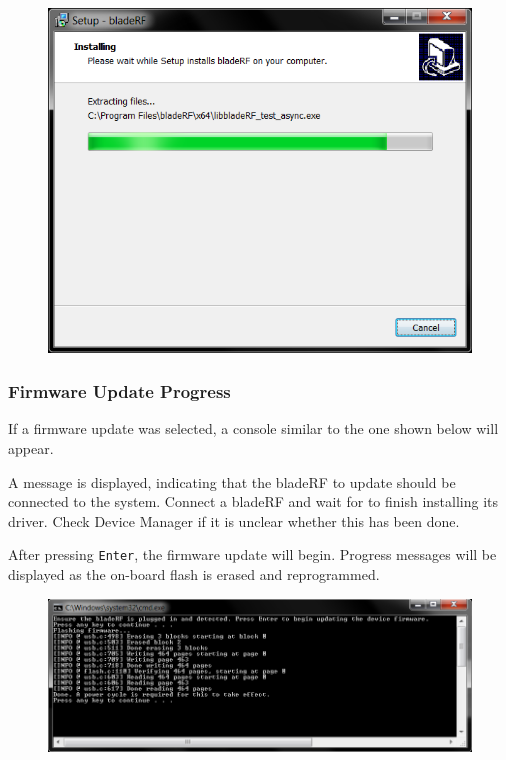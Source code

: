 {\begin{figure}[h]
  \centering
  \includegraphics{images/windows/installer/08-installing.png}
\end{figure}

\newpage
\subsubsection{Firmware Update Progress}

If a firmware update was selected, a console similar to the one
shown below will appear.

A message is displayed, indicating that the bladeRF to update should
be connected to the system. Connect a bladeRF and wait for \windows
to finish installing its driver. Check Device Manager if it is unclear
whether this has been done.

After pressing \texttt{Enter}, the firmware update will begin.
Progress messages will be displayed as the on-board flash is
erased and reprogrammed.

\begin{figure}[h]
  \centering
  \includegraphics[width=6in]{images/windows/installer/09-fwupdate.png}
\end{figure}

}

